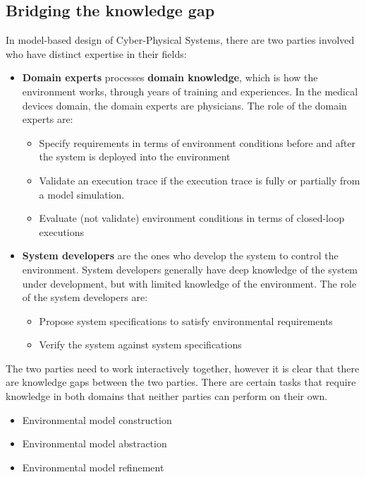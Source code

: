 \documentclass{llncs}
\begin{document}
\subsection{Bridging the knowledge gap}
In model-based design of Cyber-Physical Systems, there are two parties involved who have distinct expertise in their fields:
\begin{itemize}
	\item \textbf{Domain experts} processes \textbf{domain knowledge}, which is how the environment works, through years of training and experiences. In the medical devices domain, the domain experts are physicians. The role of the domain experts are:
        \begin{itemize}
        	\item Specify requirements in terms of environment conditions before and after the system is deployed into the environment
            \item Validate an execution trace if the execution trace is fully or partially from a model simulation.
            \item Evaluate (not validate) environment conditions in terms of closed-loop executions
        \end{itemize}
    
    \item \textbf{System developers} are the ones who develop the system to control the environment. System developers generally have deep knowledge of the system under development, but with limited knowledge of the environment. The role of the system developers are:
        \begin{itemize}
        	\item Propose system specifications to satisfy environmental requirements
            \item Verify the system against system specifications
        \end{itemize}
\end{itemize}
The two parties need to work interactively together, however it is clear that there are knowledge gaps between the two parties. There are certain tasks that require knowledge in both domains that neither parties can perform on their own.
\begin{itemize}
	\item Environmental model construction
    \item Environmental model abstraction
    \item Environmental model refinement
\end{itemize}
\end{document}

